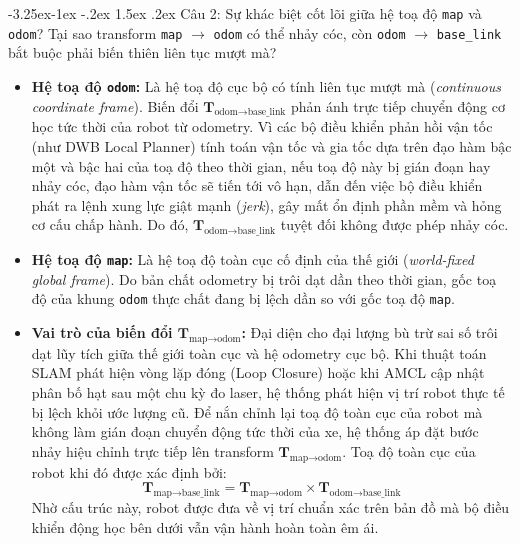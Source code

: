 \documentclass[11pt,a4paper]{article}
\makeatletter
\renewcommand{\subsection}{\@startsection{subsection}{2}{\z@}%
  {-3.25ex\@plus -1ex \@minus -.2ex}%
  {1.5ex \@plus .2ex}%
  {\normalfont\large\bfseries\color{secondary}}}
\makeatother
\begin{document}
\subsection{Câu 2: Sự khác biệt cốt lõi giữa hệ toạ độ \texttt{map} và \texttt{odom}? Tại sao transform \texttt{map} \texorpdfstring{$\to$}{->} \texttt{odom} có thể nhảy cóc, còn \texttt{odom} \texorpdfstring{$\to$}{->} \texttt{base\_link} bắt buộc phải biến thiên liên tục mượt mà?}
\begin{itemize}
  \item \textbf{Hệ toạ độ \texttt{odom}:} Là hệ toạ độ cục bộ có tính liên tục mượt mà (\textit{continuous coordinate frame}). Biến đổi $\mathbf{T}_{\text{odom} \to \text{base\_link}}$ phản ánh trực tiếp chuyển động cơ học tức thời của robot từ odometry. Vì các bộ điều khiển phản hồi vận tốc (như DWB Local Planner) tính toán vận tốc và gia tốc dựa trên đạo hàm bậc một và bậc hai của toạ độ theo thời gian, nếu toạ độ này bị gián đoạn hay nhảy cóc, đạo hàm vận tốc sẽ tiến tới vô hạn, dẫn đến việc bộ điều khiển phát ra lệnh xung lực giật mạnh (\textit{jerk}), gây mất ổn định phần mềm và hỏng cơ cấu chấp hành. Do đó, $\mathbf{T}_{\text{odom} \to \text{base\_link}}$ tuyệt đối không được phép nhảy cóc.
  \item \textbf{Hệ toạ độ \texttt{map}:} Là hệ toạ độ toàn cục cố định của thế giới (\textit{world-fixed global frame}). Do bản chất odometry bị trôi dạt dần theo thời gian, gốc toạ độ của khung \texttt{odom} thực chất đang bị lệch dần so với gốc toạ độ \texttt{map}.
  \item \textbf{Vai trò của biến đổi $\mathbf{T}_{\text{map} \to \text{odom}}$:} Đại diện cho đại lượng bù trừ sai số trôi dạt lũy tích giữa thế giới toàn cục và hệ odometry cục bộ. Khi thuật toán SLAM phát hiện vòng lặp đóng (Loop Closure) hoặc khi AMCL cập nhật phân bố hạt sau một chu kỳ đo laser, hệ thống phát hiện vị trí robot thực tế bị lệch khỏi ước lượng cũ. Để nắn chỉnh lại toạ độ toàn cục của robot mà không làm gián đoạn chuyển động tức thời của xe, hệ thống áp đặt bước nhảy hiệu chỉnh trực tiếp lên transform $\mathbf{T}_{\text{map} \to \text{odom}}$. Toạ độ toàn cục của robot khi đó được xác định bởi:
  \begin{equation}
    \mathbf{T}_{\text{map} \to \text{base\_link}} = \mathbf{T}_{\text{map} \to \text{odom}} \times \mathbf{T}_{\text{odom} \to \text{base\_link}}
  \end{equation}
  Nhờ cấu trúc này, robot được đưa về vị trí chuẩn xác trên bản đồ mà bộ điều khiển động học bên dưới vẫn vận hành hoàn toàn êm ái.
\end{itemize}
\end{document}
